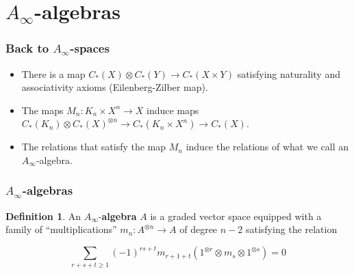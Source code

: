 \documentclass{beamer}
\theoremstyle{definition}
\newtheorem{defi}{Definition}
\begin{document}
\section{$A_\infty$-algebras}
\begin{frame}
\frametitle{Back to $A_\infty$-spaces}
\begin{itemize}
\item<1-> There is a map $C_*(X)\otimes C_*(Y)\to C_*(X\times Y)$ satisfying naturality and associativity axioms (Eilenberg-Zilber map).
\item<2-> The maps $M_n:K_n\times X^n\to X$ induce maps $C_*(K_n)\otimes C_*(X)^{\otimes n}\to C_*(K_n\times  X^n)\to C_*(X)$. %


\item<4-> The relations that satisfy the map $M_n$ induce the relations of what we call an $A_\infty$-algebra.
\end{itemize}
\end{frame}

\begin{frame}
%
%
\end{frame}
\begin{frame}
\frametitle{$A_\infty$-algebras}
\begin{defi}
An $A_\infty$-\textbf{algebra} $A$ is a graded vector space equipped with a family of ``multiplications'' $m_n:A^{\otimes n}\to A$ of degree $n-2$ satisfying the relation %

\[\sum_{r+s+t\geq 1}(-1)^{rs+t}m_{r+1+t}(1^{\otimes r}\otimes m_s\otimes 1^{\otimes s})=0\] %
\end{defi}
\end{frame}
\end{document}

